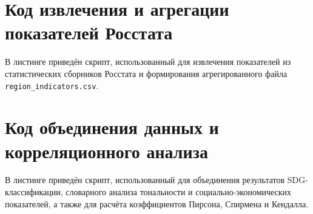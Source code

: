 \documentclass[master, och, coursework]{SCWorks1}
\begin{document}
\section{Код извлечения и агрегации показателей Росстата}
\label{app:extract-code}

В листинге приведён скрипт, использованный для извлечения показателей из статистических сборников Росстата и формирования агрегированного файла \texttt{region\_indicators.csv}.


\section{Код объединения данных и корреляционного анализа}
\label{app:merge-code}

В листинге приведён скрипт, использованный для объединения результатов SDG-классификации, словарного анализа тональности и социально-экономических показателей, а также для расчёта коэффициентов Пирсона, Спирмена и Кендалла.

	
\end{document}
